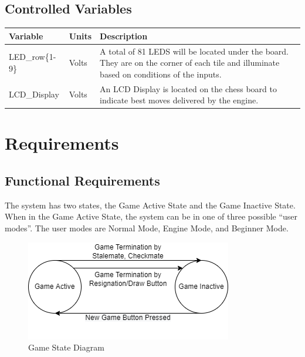 \documentclass[12pt]{article}
\begin{document}
{\subsection{Controlled Variables}

\begin{table}[H]
  \centering
      \setlength{\leftmargini}{0.4cm}
      \begin{tabular}{| >{\centering\arraybackslash}m{3cm} | 
        >{\centering\arraybackslash}m{2cm} | 
        >{\centering\arraybackslash}m{9cm} |}
      \hline
      \rowcolor[gray]{0.9}
      Variable & Units & Description\\
      \hline 
      LED\_row\{1-9\} & Volts & A total of 81 LEDS will be located under the board. They 
      are on the corner of each tile and illuminate based on conditions of the inputs. \\
      \hline 
      LCD\_Display & Volts & An LCD Display is located on the chess board to indicate
      best moves delivered by the engine. \\
      \hline 
      \end{tabular}
  \label{Table}
  \end{table}


\section{Requirements}
\subsection{Functional Requirements}
{The system has two states, the Game Active State and the Game Inactive State. When in the Game Active State, the system can be in one of three possible ``user modes''. The user modes are Normal Mode, Engine Mode, and Beginner Mode.}

\begin{figure}[h]
    \begin{center}
        \includegraphics[scale=0.75]{GameActiveFSM.drawio}
        \caption{Game State Diagram}
        \label{Fig_GameStates} 
    \end{center}
\end{figure}

}
\end{document}

